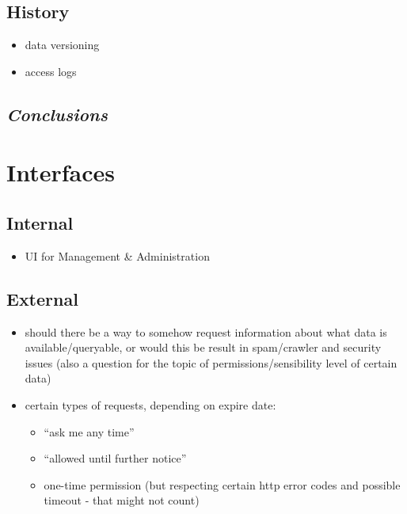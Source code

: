 \documentclass[12pt,english,a4paper,titlepage,cleardoublepage=empty,dottedtoc]{report}
\providecommand{\tightlist}{%
  \setlength{\itemsep}{0pt}\setlength{\parskip}{0pt}}
\begin{document}
\subsection{History}\label{history}

\begin{itemize}
\tightlist
\item
  data versioning
\item
  access logs
\end{itemize}

\subsection{\texorpdfstring{\emph{Conclusions}}{Conclusions}}\label{conclusions-1}

\section{Interfaces}\label{interfaces-1}

\subsection{Internal}\label{internal}

\begin{itemize}
\tightlist
\item
  UI for Management \& Administration
\end{itemize}

\subsection{External}\label{external}

\begin{itemize}
\item
  should there be a way to somehow request information about what data
  is available/queryable, or would this be result in spam/crawler and
  security issues (also a question for the topic of
  permissions/sensibility level of certain data)
\item
  certain types of requests, depending on expire date:

  \begin{itemize}
  \tightlist
  \item
    ``ask me any time''
  \item
    ``allowed until further notice''
  \item
    one-time permission (but respecting certain http error codes and
    possible timeout - that might not count)
  \end{itemize}
\end{itemize}
\end{document}
